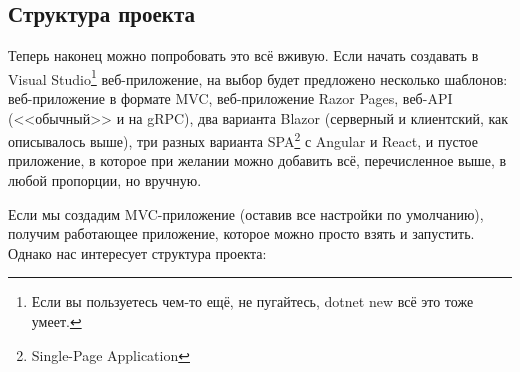 \documentclass[a5paper]{article}
\begin{document}
\subsection{Структура проекта}

Теперь наконец можно попробовать это всё вживую. Если начать создавать в Visual Studio\footnote{Если вы пользуетесь чем-то ещё, не пугайтесь, dotnet new всё это тоже умеет.} веб-приложение, на выбор будет предложено несколько шаблонов: веб-приложение в формате MVC, веб-приложение Razor Pages, веб-API (<<обычный>> и на gRPC), два варианта Blazor (серверный и клиентский, как описывалось выше), три разных варианта SPA\footnote{Single-Page Application} с Angular и React, и пустое приложение, в которое при желании можно добавить всё, перечисленное выше, в любой пропорции, но вручную.

Если мы создадим MVC-приложение (оставив все настройки по умолчанию), получим работающее приложение, которое можно просто взять и запустить. Однако нас интересует структура проекта:
\end{document}
